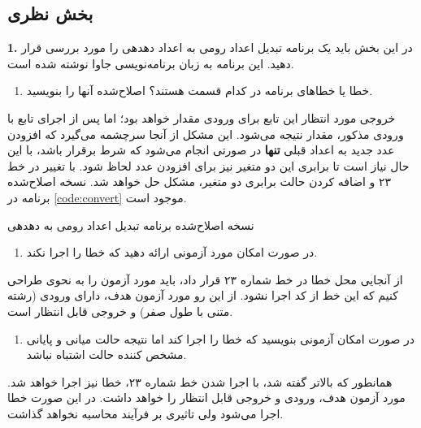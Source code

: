 \documentclass{article}
\newenvironment{answer}{}{\\[.3ex]}
\newenvironment{question}[1]{\textbf{#1.} }{}
\newenvironment{qitem}[1]{%
	\begin{enumerate}\item[(#1)]}{\end{enumerate}}
\begin{document}
\subsection*{بخش نظری}
\begin{question}{1}
در این بخش باید یک برنامه تبدیل اعداد رومی به اعداد دهدهی را مورد بررسی قرار دهید. این برنامه به زبان برنامه‌نویسی جاوا نوشته شده است.
\end{question}
\begin{qitem}{a}
خطا یا خطاهای برنامه در کدام قسمت هستند؟ اصلاح‌شده آنها را بنویسید.
\end{qitem}
\begin{answer}
خروجی مورد انتظار این تابع برای ورودی  مقدار  خواهد بود؛ اما پس از اجرای تابع با ورودی مذکور، مقدار  نتیجه می‌شود. این مشکل از آنجا سرچشمه می‌گیرد که افزودن عدد جدید به اعداد قبلی \textbf{تنها} در صورتی انجام می‌شود که شرط  برقرار باشد، با این حال نیاز است تا برابری این دو متغیر نیز برای افزودن عدد لحاظ شود. با تغییر در خط ۲۳ و اضافه کردن حالت برابری دو متغیر، مشکل حل خواهد شد. نسخه اصلاح‌شده برنامه در \autoref{code:convert} موجود است.
\end{answer}
\begin{listing}[h]
\caption{نسخه اصلاح‌شده برنامه تبدیل اعداد رومی به دهدهی}
\label{code:convert}
\end{listing}
\begin{qitem}{b}
در صورت امکان مورد آزمونی ارائه دهید که خطا را اجرا نکند.
\end{qitem}
\begin{answer}
از آنجایی محل خطا در خط شماره ۲۳ قرار داد، باید مورد آزمون را به نحوی طراحی کنیم که این خط از کد اجرا نشود. از این رو مورد آزمون هدف، دارای ورودی  (رشته متنی با طول صفر) و خروجی قابل انتظار  است.
\end{answer}
\begin{qitem}{c}
در صورت امکان آزمونی بنویسید که خطا را اجرا کند اما نتیجه حالت میانی و پایانی مشخص کننده حالت اشتباه نباشد.
\end{qitem}
\begin{answer}
همانطور که بالاتر گفته شد، با اجرا شدن خط شماره ۲۳، خطا نیز اجرا خواهد شد. مورد آزمون هدف، ورودی  و خروجی قابل انتظار  را خواهد داشت. در این صورت خطا اجرا می‌شود ولی تاثیری بر فرآیند محاسبه نخواهد گذاشت.
\end{answer}
\end{document}

